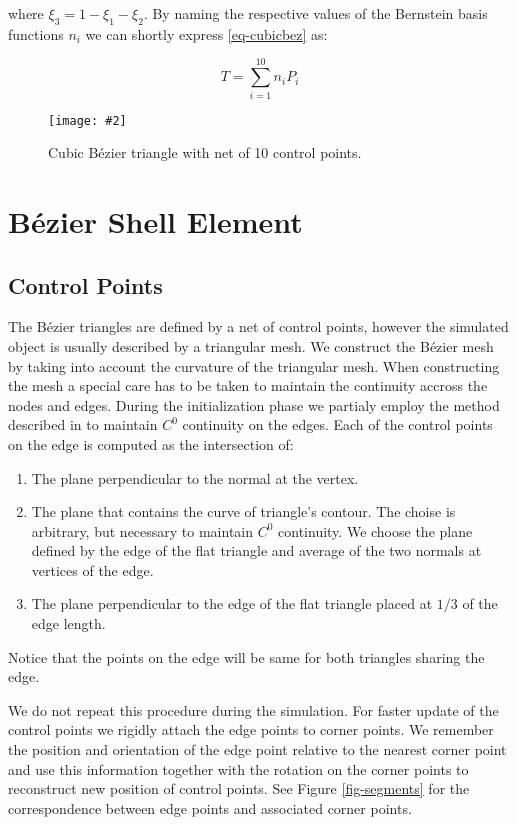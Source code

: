 \documentclass{egpubl}
\newcommand{\Figure}[3]{%
\begin{figure}[htb]
  \centering
  \texttt{[image: \#2]}
  \caption{\label{fig-#2}#3}
\end{figure}}
\begin{document}
\noindent
where $ \xi_3 = 1 - \xi_1 - \xi_2 $. By naming the respective values of
the Bernstein basis functions $n_i$ we can shortly express
\eqref{eq-cubicbez} as:

\begin{equation}\label{eq-cubicbez2}
    T = \sum_{i=1}^{10} n_i P_i
\end{equation}

\Figure{0.8\linewidth}{bezier}
{Cubic Bézier triangle with net of 10 control points.}



\section{Bézier Shell Element} %

\subsection{Control Points} %

The Bézier triangles are defined by a net of control points, however the
simulated object is usually described by a triangular mesh. We construct
the Bézier mesh by taking into account the curvature of the triangular
mesh. When constructing the mesh a special care has to be taken to maintain
the continuity accross the nodes and edges. During the initialization phase
we partialy employ the method described in \cite{Ubach2010} to maintain
$C^0$ continuity on the edges. Each of the control points on the edge is
computed as the intersection of:

\begin{enumerate}
    \item The plane perpendicular to the normal at the vertex.
    \item The plane that contains the curve of triangle's contour. The
        choise is arbitrary, but necessary to maintain $C^0$ continuity. 
        We choose the plane defined by the edge of the flat triangle and
        average of the two normals at vertices of the edge. 
    \item The plane perpendicular to the edge of the flat triangle placed at
        $1/3$ of the edge length.
\end{enumerate}

Notice that the points on the edge will be same for both triangles sharing
the edge.

We do not repeat this procedure during the simulation. For faster update of
the control points we rigidly attach the edge points to corner points. We
remember the position and orientation of the edge point relative to the
nearest corner point and use this information together with the rotation on
the corner points to reconstruct new position of control points. See Figure
\ref{fig-segments} for the correspondence between edge points and
associated corner points.
\end{document}
